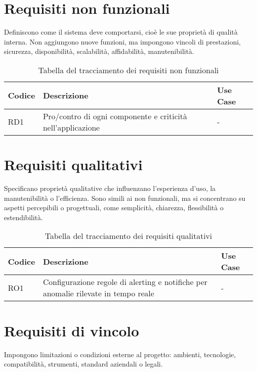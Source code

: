 \newpage
\section{Requisiti non funzionali}
Definiscono come il sistema deve comportarsi, cioè le sue proprietà di qualità interna.
Non aggiungono nuove funzioni, ma impongono vincoli di prestazioni, sicurezza, disponibilità, scalabilità, affidabilità, manutenibilità.

\begin{table}[h]
\caption{Tabella del tracciamento dei requisiti non funzionali}
\label{tab:requisiti-non-funzionali}
\begin{tabularx}{\textwidth}{lXl}
\hline\hline
\textbf{Codice} & \textbf{Descrizione} & \textbf{Use Case}\\
\hline
RD1    & Pro/contro di ogni componente e criticità nell'applicazione & - \\
\hline
\end{tabularx}
\end{table}%


\newpage
\section{Requisiti qualitativi}
Specificano proprietà qualitative che influenzano l'esperienza d'uso, la manutenibilità o l'efficienza.
Sono simili ai non funzionali, ma si concentrano su aspetti percepibili o progettuali, come semplicità, chiarezza, flessibilità o estendibilità.

\begin{table}[h]
\caption{Tabella del tracciamento dei requisiti qualitativi}
\label{tab:requisiti-qualitativi}
\begin{tabularx}{\textwidth}{lXl}
\hline\hline
\textbf{Codice} & \textbf{Descrizione} & \textbf{Use Case}\\
\hline
RO1    & Configurazione regole di alerting e notifiche per anomalie rilevate in tempo reale & - \\
\hline
\end{tabularx}
\end{table}%

\newpage
\section{Requisiti di vincolo}
Impongono limitazioni o condizioni esterne al progetto: ambienti, tecnologie, compatibilità, strumenti, standard aziendali o legali.

